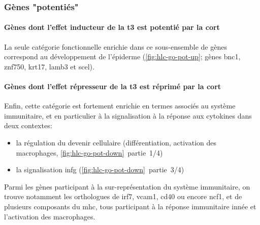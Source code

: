 \documentclass[../main.tex]{subfiles}
\begin{document}



\subsubsection{Gènes "potentiés"}

\paragraph{Gènes dont l'effet inducteur de la \gls{t3} est potentié par la \gls{cort}}
La seule catégorie fonctionnelle enrichie dans ce sous-ensemble de gènes correspond au développement de l'épiderme (\autoref{fig:hlc-go-pot-up}; gènes \gls{bnc1}, \gls{znf750}, \gls{krt17}, \gls{lamb3} et \gls{scel}).



\paragraph{Gènes dont l'effet répresseur de la \gls{t3} est réprimé par la \gls{cort}}\label{par:hlc-go-pot-down}
Enfin, cette catégorie est fortement enrichie en termes associés au système immunitaire, et en particulier à la signalisation à la réponse aux cytokines dans deux contextes:
\begin{itemize}
\item la régulation du devenir cellulaire (différentiation, activation des macrophages, \autoref{fig:hlc-go-pot-down}~partie~1/4)
\item la signalisation \gls{infg} (\autoref{fig:hlc-go-pot-down}~partie~3/4)
\end{itemize}



Parmi les gènes participant à la sur-représentation du système immunitaire, on trouve notamment les orthologues de \gls{irf7}, \gls{vcam1}, \gls{cd40} ou encore \gls{ncf1}, et de plusieurs composants du \gls{mhc}, tous participant à la réponse immunitaire innée et l'activation des macrophages.
\end{document}
